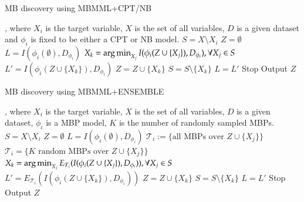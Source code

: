 \documentclass{svmult}
\begin{document}
\begin{algorithm}[]
\caption{MB discovery using MBMML+CPT/NB}
\label{alg:mbmmlf}
\begin{algorithmic}[MBMML]
, where $X_i$ is the target variable, $X$ is the set of all variables, $D$ is a given dataset and $\phi_i$ is fixed to be either a CPT or  NB model.
    \State $S = X \setminus {X_i}$ 
    \State $Z = \emptyset$ 
    \State $L = I(\phi_i(\emptyset), D_{\phi_i})$  
    		\State $X_k = \operatorname*{arg\,min}_{X_j} I(\phi_i(Z \cup \{X_j\}), D_{\phi_i}), \forall X_j \in S$ 
    		\State $L' = I(\phi_i(Z \cup \{X_k\}), D_{\phi_i})$ 
    		 
    			\State $Z = Z \cup \{X_k\}$
    			\State $S = S \setminus \{X_k\}$
    			\State $L = L'$ 
    		\Else
    			\State Stop 
			\EndIf
	\EndWhile
	\State Output $Z$
\EndProcedure
\end{algorithmic}
\end{algorithm}

\begin{algorithm}[]
\caption{MB discovery using MBMML+ENSEMBLE}
\label{alg:mbmmlr}
\begin{algorithmic}[MBMML]
, where $X_i$ is the target variable, $X$ is the set of all variables, $D$ is a given dataset, $\phi_i$ is a MBP model, $K$ is the number of randomly sampled MBPs. 
    \State $S = X \setminus {X_i}$ 
    \State $Z = \emptyset$ 
    \State $L = I(\phi_i(\emptyset), D_{\phi_i})$  
    		 
    			\State $\mathcal{T}_i := \{\text{all MBPs over } Z \cup \{X_j\}\}$ 
    		\Else
    			\State $\mathcal{T}_i =  \{K \text{ random MBPs over } Z \cup \{X_j\}\}$ 
    		\EndIf 
    		\State $X_k = \operatorname*{arg\,min}_{X_j} E_{\mathcal{T}_i}(I(\phi_i(Z \cup \{X_j\}), D_{\phi_i})), \forall X_j \in S$ 
    		\State $L' = E_{\mathcal{T}_i}(I(\phi_i(Z \cup \{X_k\}), D_{\phi_i}))$ 
    		 
    			\State $Z = Z \cup \{X_k\}$
    			\State $S = S \setminus \{X_k\}$
    			\State $L = L'$ 
    		\Else
    			\State Stop 
			\EndIf
	\EndWhile
	\State Output $Z$
\EndProcedure
\end{algorithmic}
\end{algorithm}
\end{document}
